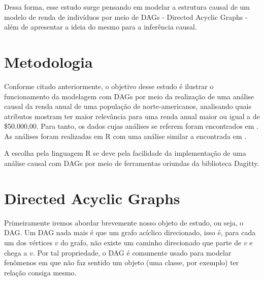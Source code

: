 \documentclass[11pt,letterpaper,twocolumn]{article}
\begin{document}
Dessa forma, esse estudo surge pensando em modelar a estrutura causal de um modelo de renda de indivíduos por meio de DAGs - Directed Acyclic Graphs - além de apresentar a ideia do mesmo para a inferência causal.

\section{Metodologia}
\justify

Conforme citado anteriormente, o objetivo desse estudo é ilustrar o funcionamento da modelagem com DAGs por meio da realização de uma análise causal da renda anual de uma população de norte-americanos, analisando quais atributos mostram ter maior relevância para uma renda anual maior ou igual a de \$50.000,00. Para tanto, os dados cujas análises se referem foram encontrados em \cite{dua2019}. As análises foram realizadas em R com uma análise similar a encontrada em \cite{ct}.

A escolha pela linguagem R se deve pela facilidade da implementação de uma análise causal com DAGs por meio de ferramentas oriundas da biblioteca {\selectfont Dagitty}.

\section{Directed Acyclic Graphs}

Primeiramente iremos abordar brevemente nosso objeto de estudo, ou seja, o DAG. Um DAG nada mais é que um grafo acíclico direcionado, isso é, para cada um dos vértices $v$ do grafo, não existe um caminho direcionado que parte de $v$ e chega a $v$. Por tal propriedade, o DAG é comumente usado para modelar fenômenos em que não faz sentido um objeto (uma classe, por exemplo) ter relação consiga mesmo.
\end{document}
